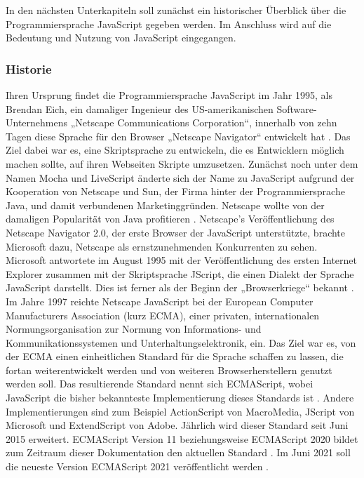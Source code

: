 In den nächsten Unterkapiteln soll zunächst ein historischer Überblick über die Programmiersprache JavaScript gegeben werden. Im Anschluss wird auf die Bedeutung und Nutzung von JavaScript eingegangen. 
\newline

\subsubsection{Historie}
Ihren Ursprung findet die Programmiersprache JavaScript im Jahr 1995, als Brendan Eich, ein damaliger Ingenieur des US-amerikanischen Software-Unternehmens „Netscape Communications Corporation“, innerhalb von zehn Tagen diese Sprache für den Browser „Netscape Navigator“ entwickelt hat \cite{JS1}. Das Ziel dabei war es, eine Skriptsprache zu entwickeln, die es Entwicklern möglich machen sollte, auf ihren Webseiten Skripte umzusetzen. Zunächst noch unter dem Namen Mocha und LiveScript änderte sich der Name zu JavaScript aufgrund der Kooperation von Netscape und Sun, der Firma hinter der Programmiersprache Java, und damit verbundenen Marketinggründen. Netscape wollte von der damaligen Popularität von Java profitieren \cite{JS1.05}.
\newline
\noindent
Netscape’s Veröffentlichung des Netscape Navigator 2.0, der erste Browser der JavaScript unterstützte, brachte Microsoft dazu, Netscape als ernstzunehmenden Konkurrenten zu sehen. 
Microsoft antwortete im August 1995 mit der Veröffentlichung des ersten Internet Explorer zusammen mit der Skriptsprache JScript, die einen Dialekt der Sprache JavaScript darstellt. Dies ist ferner als der Beginn der „Browserkriege“ bekannt \cite{JS1.06}.
\newline
\noindent
Im Jahre 1997 reichte Netscape JavaScript bei der European Computer Manufacturers Association (kurz ECMA), einer privaten, internationalen Normungsorganisation zur Normung von Informations- und Kommunikationssystemen und Unterhaltungselektronik, ein. Das Ziel war es, von der ECMA einen einheitlichen Standard für die Sprache schaffen zu lassen, die fortan weiterentwickelt werden und von weiteren Browserherstellern genutzt werden soll. Das resultierende Standard nennt sich ECMAScript, wobei JavaScript die bisher bekannteste Implementierung dieses Standards ist \cite{JS1.07}.
Andere Implementierungen sind zum Beispiel ActionScript von Macro\-Media, JScript von Microsoft und ExtendScript von Adobe.
\newline
\noindent
Jährlich wird dieser Standard seit Juni 2015 erweitert. ECMAScript Version 11 beziehungs\-weise ECMAScript 2020 bildet zum Zeitraum dieser Dokumentation den aktuellen Standard \cite{JS1.08}. 
Im Juni 2021 soll die neueste Version ECMAScript 2021 veröffentlicht werden \cite{JS1.09}. 
\newline

